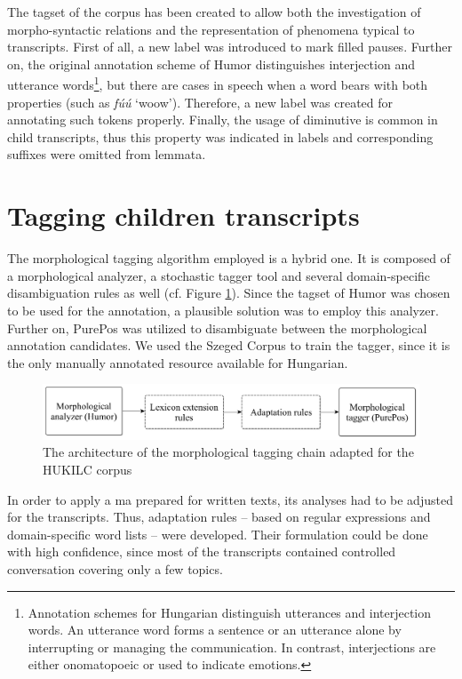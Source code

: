 The tagset of the corpus has been created to allow both the investigation of morpho-syntactic relations and the representation of phenomena typical to transcripts. 
First of all, a new label was introduced to mark filled pauses. 
Further on, the original annotation scheme of Humor distinguishes interjection and utterance words\footnote{Annotation schemes for Hungarian distinguish utterances and interjection words. An utterance word forms a sentence or an utterance alone by interrupting or managing the communication. In contrast, interjections are either onomatopoeic or used to indicate emotions.},
but there are cases in speech when a word bears with both properties (such as \textit{fúú} `woow’). 
Therefore, a new label was created for annotating such tokens properly. 
Finally, the usage of diminutive is common in child transcripts, thus this property was indicated in labels and corresponding suffixes were omitted from lemmata.

\section{Tagging children transcripts}
\label{sec:tagging}
The morphological tagging algorithm employed is a hybrid one. 
It is composed of a morphological analyzer, a stochastic tagger tool and several domain-specific disambiguation rules as well (cf. Figure \ref{fig:speech-tagger}). 
Since the tagset of Humor was chosen to be used for the annotation, a plausible solution was to employ this analyzer. 
Further on, PurePos was utilized to disambiguate between the morphological annotation candidates. 
We used the Szeged Corpus \cite{Csendes2004} to train the tagger, since it is the only manually annotated resource available for Hungarian. 

\begin{figure}[H]
  \centering
  \includegraphics[scale=0.2]{MorphComplexity/mlu_architecture.png} 
  \caption{The architecture of the morphological tagging chain adapted for the HUKILC corpus}
  \label{fig:speech-tagger}
\end{figure}


In order to apply a \acrlong{ma} prepared for written texts, its analyses had to be adjusted for the transcripts. 
Thus, adaptation rules -- based on regular expressions and domain-specific word lists -- were developed.
Their formulation could be done with high confidence, since most of the transcripts contained controlled conversation covering only a few topics. 

